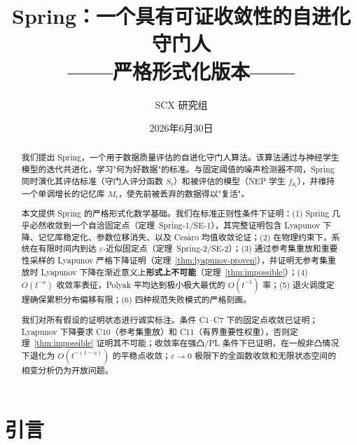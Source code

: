 \title{\textbf{Spring：一个具有可证收敛性的自进化守门人}\\
       {\large ——严格形式化版本——}}

\author{SCX 研究组}

\date{2026年6月30日}


\maketitle

\begin{abstract}
我们提出 Spring，一个用于数据质量评估的自进化守门人算法。该算法通过与神经学生模型的迭代共进化，学习"何为好数据"的标准。与固定阈值的噪声检测器不同，Spring 同时演化其评估标准（守门人评分函数 $S_t$）和被评估的模型（NEP 学生 $f_{\theta_t}$），并维持一个单调增长的记忆库 $M_t$，使先前被丢弃的数据得以"复活"。

本文提供 Spring 的严格形式化数学基础。我们在标准正则性条件下证明：(1) Spring 几乎必然收敛到一个自洽固定点（定理~Spring-1/SE-1），其完整证明包含 Lyapunov 下降、记忆库稳定化、参数位移消失、以及 Ces\`{a}ro 均值收敛论证；(2) 在物理约束下，系统在有限时间内到达 $\varepsilon$-近似固定点（定理~Spring-2/SE-2）；(3) 通过参考集重放和重要性采样的 Lyapunov 严格下降证明（定理~\ref{thm:lyapunov-proven}），并证明无参考集重放时 Lyapunov 下降在渐近意义上\textbf{形式上不可能}（定理~\ref{thm:impossible}）；(4) $O(t^{-a})$ 收敛率表征，Polyak 平均达到极小极大最优的 $O(t^{-1})$ 率；(5) 退火调度定理确保累积分布偏移有限；(6) 四种规范失败模式的严格刻画。

我们对所有假设的证明状态进行诚实标注。条件 C1--C7 下的固定点收敛已证明；Lyapunov 下降要求 C10（参考集重放）和 C11（有界重要性权重），否则定理~\ref{thm:impossible} 证明其不可能；收敛率在强凸/PL 条件下已证明，在一般非凸情况下退化为 $O(t^{-(1-a)})$ 的平稳点收敛；$\varepsilon \to 0$ 极限下的全函数收敛和无限状态空间的相变分析仍为开放问题。
\end{abstract}

\section{引言}

